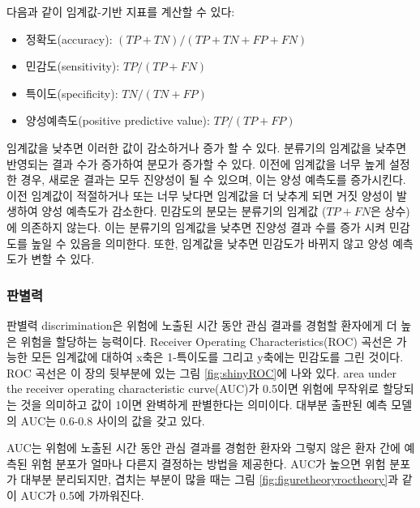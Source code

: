 \documentclass[10.5pt]{book}
\providecommand{\tightlist}{%
  \setlength{\itemsep}{0pt}\setlength{\parskip}{0pt}}
\theoremstyle{definition}
\theoremstyle{definition}
\theoremstyle{definition}
\theoremstyle{remark}
\begin{document}
다음과 같이 임계값-기반 지표를 계산할 수 있다:

\begin{itemize}
\tightlist
\item
  정확도(accuracy): \((TP+TN)/(TP+TN+FP+FN)\)
\item
  민감도(sensitivity): \(TP/(TP+FN)\)
\item
  특이도(specificity): \(TN/(TN+FP)\)
\item
  양성예측도(positive predictive value): \(TP/(TP+FP)\)
\end{itemize}

임계값을 낮추면 이러한 값이 감소하거나 증가 할 수 있다. 분류기의
임계값을 낮추면 반영되는 결과 수가 증가하여 분모가 증가할 수 있다.
이전에 임계값을 너무 높게 설정한 경우, 새로운 결과는 모두 진양성이 될 수
있으며, 이는 양성 예측도를 증가시킨다. 이전 임계값이 적절하거나 또는
너무 낮다면 임계값을 더 낮추게 되면 거짓 양성이 발생하여 양성 예측도가
감소한다. 민감도의 분모는 분류기의 임계값 (\(TP+FN\)은 상수)에 의존하지
않는다. 이는 분류기의 임계값을 낮추면 진양성 결과 수를 증가 시켜
민감도를 높일 수 있음을 의미한다. 또한, 임계값을 낮추면 민감도가 바뀌지
않고 양성 예측도가 변할 수 있다.

\subsubsection*{판별력}

판별력 discrimination은 위험에 노출된 시간 동안 관심 결과를 경험할
환자에게 더 높은 위험을 할당하는 능력이다. Receiver Operating
Characteristics(ROC) 곡선은 가능한 모든 임계값에 대하여 x축은 1-특이도를
그리고 y축에는 민감도를 그린 것이다. ROC 곡선은 이 장의 뒷부분에 있는
그림 \ref{fig:shinyROC}에 나와 있다. area under the receiver operating
characteristic curve(AUC)가 0.5이면 위험에 무작위로 할당되는 것을
의미하고 값이 1이면 완벽하게 판별한다는 의미이다. 대부분 출판된 예측
모델의 AUC는 0.6-0.8 사이의 값을 갖고 있다.  

AUC는 위험에 노출된 시간 동안 관심 결과를 경험한 환자와 그렇지 않은 환자
간에 예측된 위험 분포가 얼마나 다른지 결정하는 방법을 제공한다. AUC가
높으면 위험 분포가 대부분 분리되지만, 겹치는 부분이 많을 때는 그림
\ref{fig:figuretheoryroctheory}과 같이 AUC가 0.5에 가까워진다.
\end{document}
